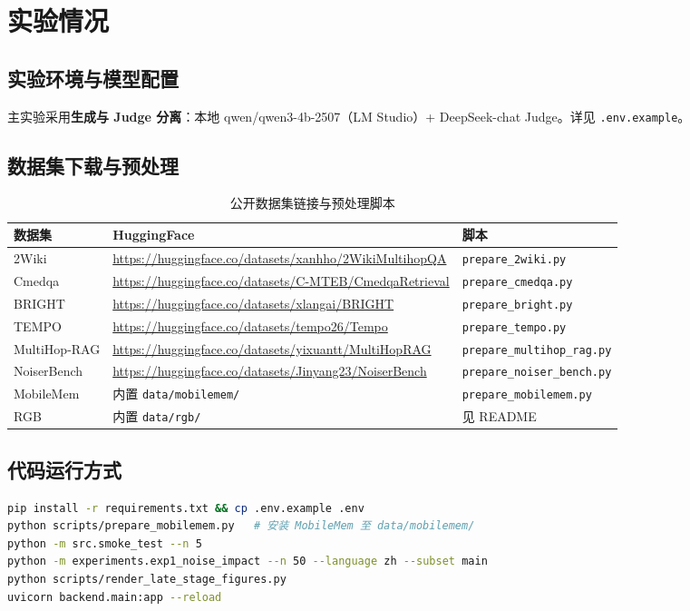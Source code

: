 \documentclass[UTF8,zihao=-4]{ctexart}
\begin{document}
\section{实验情况}

\subsection{实验环境与模型配置}
主实验采用\textbf{生成与 Judge 分离}：本地 qwen/qwen3-4b-2507（LM Studio）+ DeepSeek-chat Judge。详见 \texttt{.env.example}。

\subsection{数据集下载与预处理}
\begin{table}[H]
  \centering
  \caption{公开数据集链接与预处理脚本}
  \small
  \begin{tabularx}{\textwidth}{llY}
    \toprule
    数据集 & HuggingFace & 脚本 \\
    \midrule
    2Wiki & \url{https://huggingface.co/datasets/xanhho/2WikiMultihopQA} & \texttt{prepare\_2wiki.py} \\
    Cmedqa & \url{https://huggingface.co/datasets/C-MTEB/CmedqaRetrieval} & \texttt{prepare\_cmedqa.py} \\
    BRIGHT & \url{https://huggingface.co/datasets/xlangai/BRIGHT} & \texttt{prepare\_bright.py} \\
    TEMPO & \url{https://huggingface.co/datasets/tempo26/Tempo} & \texttt{prepare\_tempo.py} \\
    MultiHop-RAG & \url{https://huggingface.co/datasets/yixuantt/MultiHopRAG} & \texttt{prepare\_multihop\_rag.py} \\
    NoiserBench & \url{https://huggingface.co/datasets/Jinyang23/NoiserBench} & \texttt{prepare\_noiser\_bench.py} \\
    MobileMem & 内置 \texttt{data/mobilemem/} & \texttt{prepare\_mobilemem.py} \\
    RGB & 内置 \texttt{data/rgb/} & 见 README \\
    \bottomrule
  \end{tabularx}
\end{table}

\subsection{代码运行方式}
\begin{lstlisting}[language=bash]
pip install -r requirements.txt && cp .env.example .env
python scripts/prepare_mobilemem.py   # 安装 MobileMem 至 data/mobilemem/
python -m src.smoke_test --n 5
python -m experiments.exp1_noise_impact --n 50 --language zh --subset main
python scripts/render_late_stage_figures.py
uvicorn backend.main:app --reload
\end{lstlisting}
\end{document}
